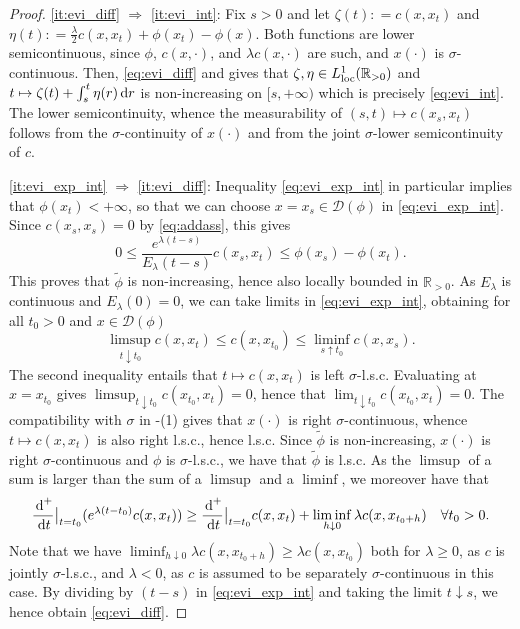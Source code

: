\documentclass[reqno]{amsart}
\theoremstyle{plain}
\theoremstyle{remark}
\theoremstyle{plain}
\numberwithin{equation}{section}
\theoremstyle{remark}
\newcommand{\R}{\mathbb{R}}
\newcommand{\de}{{\,\rm d}}
\newcommand{\dom}[1]{\mathscr{D}(#1)}
\begin{document}
\begin{proof}
  \ref{it:evi_diff} $\Rightarrow$ \ref{it:evi_int}:  Fix $s>0$ and let $\zeta(t) : =c(x,x_t)$ and $\eta(t) : =\frac{\lambda}{2}c(x,x_t)+\phi(x_t)-\phi(x)$. Both functions are lower semicontinuous, since $\phi$, $c(x,\cdot)$, and $\lambda c(x,\cdot)$ are such, and $x(\cdot)$ is $\sigma$-continuous.  Then, \eqref{eq:evi_diff} and \cite[Lemma A.1]{MuratoriSavare} gives that $\zeta,\eta\in L^1_{ \rm loc}( \R_{>0} )$ and $t\mapsto \zeta(t)+\int_s^t \eta(r) \de  r $ is non-increasing on $[s,+\infty)$ which is precisely \eqref{eq:evi_int}. The lower semicontinuity, whence the measurability of $(s,t) \mapsto c(x_s, x_t)$ follows from the $\sigma$-continuity of $x(\cdot)$ and  from  the  joint  $\sigma$-lower semicontinuity of $c$.



 \ref{it:evi_exp_int} $\Rightarrow$ \ref{it:evi_diff}:   Inequality  \eqref{eq:evi_exp_int}  in particular implies  that $\phi(x_t)<+\infty$, so  that  we can choose $x=x_s\in\dom{\phi}$ in \eqref{eq:evi_exp_int}.  Since $c(x_s,x_s)=0$  by \eqref{eq:addass},  this   gives 
\begin{equation}\label{eq:evi_int_applied}
    0\le\frac{  e^{\lambda(t-s)}}{E_\lambda(t-s)}c(x_s,x_t) \le \phi(x_s)-\phi(x_t).
\end{equation}
 This proves that  $\tilde \phi$ is non-increasing,  hence  also locally bounded  in $ \R_{>0}$. As $E_\lambda$ is continuous and $E_\lambda(0)=0$, we can take limits in \eqref{eq:evi_exp_int}, obtaining for all $t_0>0$ and $x \in \dom{\phi}$
\begin{equation*}
    \limsup_{t\downarrow t_0} c(x,x_t) \le c(x,x_{t_0})\le \liminf_{s\uparrow t_0} c(x,x_s).
\end{equation*}
 The second inequality entails that $t\mapsto c(x,x_t)$ is left $\sigma$-l.s.c.  Evaluating at $x=x_{t_0}$  gives $\limsup_{t\downarrow t_0} c(x_{t_0},x_t)=0$,  hence that $\lim_{t\downarrow t_0} c(x_{t_0},x_t)=0$. The compatibility  with $\sigma$ in -(1) gives that $x(\cdot)$ is right $\sigma$-continuous, whence $t\mapsto c(x,x_t)$ is also right l.s.c.,  hence l.s.c. Since $\tilde \phi$ is non-increasing, $x(\cdot)$ is right $\sigma$-continuous and $\phi$ is $\sigma$-l.s.c.,  we have that  $\tilde \phi$ is l.s.c.   As the   $\limsup$ of a sum is larger than  the  sum of  a  $\limsup$ and  a  $\liminf$, we  moreover have   that  $$\frac{\de^+}{\de t} \bigr |_{t=t_0} (e^{\lambda(t-t_0)}c(x,x_t))\ge\frac{\de^+}{\de t} \bigr |_{t=t_0}c(x,x_{t})+\liminf_{h\downarrow 0}\lambda c(x,x_{t_0+h})\quad \forall t_0>0.$$ 
  Note that we have $\liminf_{h\downarrow 0}\lambda c(x,x_{t_0+h})\ge \lambda c(x,x_{t_0})$ both for $\lambda \geq 0$, as $c$ is  jointly  $\sigma$-l.s.c., and $\lambda<0$, as $c$ is assumed to be separately $\sigma$-continuous in this case. By 
  dividing by $(t-s)$  in \eqref{eq:evi_exp_int} and taking the limit $t\downarrow s$, we  hence  obtain \eqref{eq:evi_diff}. 


\end{proof}
\end{document}
